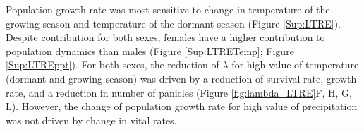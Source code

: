\documentclass[12pt]{article}
\begin{document}
Population growth rate was most sensitive to change in temperature of the growing season and temperature of the dormant season (Figure \ref{Sup:LTRE}).
Despite contribution for both sexes, females have a higher contribution to population dynamics than males (Figure \ref{Sup:LTRETemp}; Figure \ref{Sup:LTREppt}).
For both sexes, the reduction of $\lambda$ for high value of temperature  (dormant and growing season) was driven by a reduction of survival rate, growth rate, and a reduction in number of panicles (Figure \ref{fig:lambda_LTRE}F, H, G, L).
However, the change of population growth rate for high value of precipitation was not driven by change in vital rates.
\end{document}
